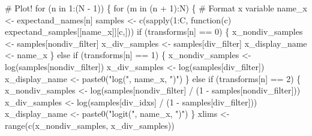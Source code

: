\documentclass[
  letterpaper,
  DIV=11,
  numbers=noendperiod]{scrartcl}
\newenvironment{Shaded}{\begin{snugshade}}{\end{snugshade}}
\newcommand{\CommentTok}[1]{\textcolor[rgb]{0.37,0.37,0.37}{#1}}
\newcommand{\ControlFlowTok}[1]{\textcolor[rgb]{0.00,0.23,0.31}{#1}}
\newcommand{\DecValTok}[1]{\textcolor[rgb]{0.68,0.00,0.00}{#1}}
\newcommand{\FunctionTok}[1]{\textcolor[rgb]{0.28,0.35,0.67}{#1}}
\newcommand{\NormalTok}[1]{\textcolor[rgb]{0.00,0.23,0.31}{#1}}
\newcommand{\OtherTok}[1]{\textcolor[rgb]{0.00,0.23,0.31}{#1}}
\newcommand{\SpecialCharTok}[1]{\textcolor[rgb]{0.37,0.37,0.37}{#1}}
\newcommand{\StringTok}[1]{\textcolor[rgb]{0.13,0.47,0.30}{#1}}
\begin{document}
\begin{Shaded}
\begin{Highlighting}[]
  \CommentTok{\# Plot!}
  \ControlFlowTok{for}\NormalTok{ (n }\ControlFlowTok{in} \DecValTok{1}\SpecialCharTok{:}\NormalTok{(N }\SpecialCharTok{{-}} \DecValTok{1}\NormalTok{)) \{}
    \ControlFlowTok{for}\NormalTok{ (m }\ControlFlowTok{in}\NormalTok{ (n }\SpecialCharTok{+} \DecValTok{1}\NormalTok{)}\SpecialCharTok{:}\NormalTok{N) \{}
      \CommentTok{\# Format x variable}
\NormalTok{      name\_x }\OtherTok{\textless{}{-}}\NormalTok{ expectand\_names[n]}
\NormalTok{      samples }\OtherTok{\textless{}{-}} \FunctionTok{c}\NormalTok{(}\FunctionTok{sapply}\NormalTok{(}\DecValTok{1}\SpecialCharTok{:}\NormalTok{C, }
                          \ControlFlowTok{function}\NormalTok{(c) expectand\_samples[[name\_x]][c,]))}
      \ControlFlowTok{if}\NormalTok{ (transforms[n] }\SpecialCharTok{==} \DecValTok{0}\NormalTok{) \{}
\NormalTok{        x\_nondiv\_samples }\OtherTok{\textless{}{-}}\NormalTok{ samples[nondiv\_filter]}
\NormalTok{        x\_div\_samples }\OtherTok{\textless{}{-}}\NormalTok{ samples[div\_filter]}
\NormalTok{        x\_display\_name }\OtherTok{\textless{}{-}}\NormalTok{ name\_x}
\NormalTok{      \} }\ControlFlowTok{else} \ControlFlowTok{if}\NormalTok{ (transforms[n] }\SpecialCharTok{==} \DecValTok{1}\NormalTok{) \{}
\NormalTok{        x\_nondiv\_samples }\OtherTok{\textless{}{-}} \FunctionTok{log}\NormalTok{(samples[nondiv\_filter])}
\NormalTok{        x\_div\_samples }\OtherTok{\textless{}{-}} \FunctionTok{log}\NormalTok{(samples[div\_filter])}
\NormalTok{        x\_display\_name }\OtherTok{\textless{}{-}} \FunctionTok{paste0}\NormalTok{(}\StringTok{"log("}\NormalTok{, name\_x, }\StringTok{")"}\NormalTok{)}
\NormalTok{      \} }\ControlFlowTok{else} \ControlFlowTok{if}\NormalTok{ (transforms[n] }\SpecialCharTok{==} \DecValTok{2}\NormalTok{) \{}
\NormalTok{        x\_nondiv\_samples }\OtherTok{\textless{}{-}} \FunctionTok{log}\NormalTok{(samples[nondiv\_filter] }\SpecialCharTok{/} 
\NormalTok{                                  (}\DecValTok{1} \SpecialCharTok{{-}}\NormalTok{ samples[nondiv\_filter]))}
\NormalTok{        x\_div\_samples }\OtherTok{\textless{}{-}} \FunctionTok{log}\NormalTok{(samples[div\_idxs] }\SpecialCharTok{/}
\NormalTok{                               (}\DecValTok{1} \SpecialCharTok{{-}}\NormalTok{ samples[div\_filter]))}
\NormalTok{        x\_display\_name }\OtherTok{\textless{}{-}} \FunctionTok{paste0}\NormalTok{(}\StringTok{"logit("}\NormalTok{, name\_x, }\StringTok{")"}\NormalTok{)}
\NormalTok{      \}}
\NormalTok{      xlims }\OtherTok{\textless{}{-}} \FunctionTok{range}\NormalTok{(}\FunctionTok{c}\NormalTok{(x\_nondiv\_samples, x\_div\_samples))}
      

\end{Highlighting}
\end{Shaded}
\end{document}
